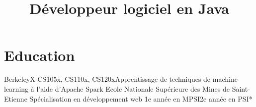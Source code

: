 \documentclass[11pt,a4paper,sans]{moderncv} %
\title{Développeur logiciel en Java}
\begin{document}
\makecvtitle %


\section{Education}

{BerkeleyX} {CS105x, CS110x, CS120x}{Apprentissage de techniques de machine learning à l'aide d'Apache Spark}
{Ecole Nationale Supérieure des Mines de Saint-Etienne} {}{Spécialisation en développement web}
{1e année en MPSI\newline2e année en PSI*}


\end{document}

